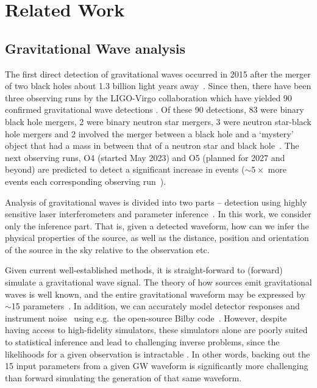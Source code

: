 \section{Related Work}
\label{sec:related_work}

\subsection{Gravitational Wave analysis}

The first direct detection of gravitational waves occurred in 2015 after the merger of two black holes about 1.3 billion light years away~\cite{LIGO_2016}. Since then, there have been three observing runs by the LIGO-Virgo collaboration which have yielded 90 confirmed gravitational wave detections . Of these 90 detections, 83 were binary black hole mergers, 2 were binary neutron star mergers, 3 were neutron star-black hole mergers and 2 involved the merger between a black hole and a `mystery' object that had a mass in between that of a neutron star and black hole~\cite{LIGO_FAQ_Website}. The next observing runs, O4 (started May 2023) and O5 (planned for 2027 and beyond) are predicted to detect a significant increase in events (${\sim}5\times$ more events each corresponding observing run~\cite{Petrov_2022}).

Analysis of gravitational waves is divided into two parts -- detection using highly sensitive laser interferometers and parameter inference~\cite{bhardwaj2023peregrine}. In this work, we consider only the inference part. That is, given a detected waveform, how can we infer the physical properties of the source, as well as the distance, position and orientation of the source in the sky relative to the observation etc.

Given current well-established methods, it is straight-forward to (forward) simulate a gravitational wave signal. The theory of how sources emit gravitational waves is well known, and the entire gravitational waveform may be expressed by $\sim$15 parameters~\cite{Thrane_Talbot_2019}. In addition, we can accurately model detector responses and instrument noise~\cite{alvey2023things} using e.g.~the open-source Bilby code~\cite{Ashton_Bilby_2019,Romero_Bilby_2020,Ashton_Talbot_Bilby_2021}. However, despite having access to high-fidelity simulators, these simulators alone are poorly suited to statistical inference and lead to challenging inverse problems, since the likelihoods for a given observation is intractable \cite{Cranmer_SBI_2020}. In other words, backing out the 15 input parameters from a given GW waveform is significantly more challenging than forward simulating the generation of that same waveform.

